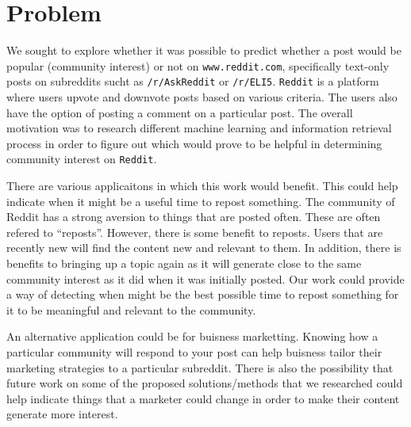 \documentclass{acm_proc_article-sp}
\begin{document}



\section{Problem}
We sought to explore whether it was possible to predict whether a post would be popular (community interest) or not on \texttt{www.reddit.com}, specifically text-only posts on subreddits sucht as \texttt{/r/AskReddit} or \texttt{/r/ELI5}. \texttt{Reddit} is a platform where users upvote and downvote posts based on various criteria. The users also have the option of posting a comment on a particular post. The overall motivation was to research different machine learning and information retrieval process in order to figure out which would prove to be helpful in determining community interest on \texttt{Reddit}.

There are various applicaitons in which this work would benefit. This could help indicate when it might be a useful time to repost something. The community of Reddit has a strong aversion to things that are posted often. These are often refered to ``reposts''. However, there is some benefit to reposts. Users that are recently new will find the content new and relevant to them. In addition, there is benefits to bringing up a topic again as it will generate close to the same community interest as it did when it was initially posted. Our work could provide a way of detecting when might be the best possible time to repost something for it to be meaningful and relevant to the community.

An alternative application could be for buisness marketting. Knowing how a particular community will respond to your post can help buisness tailor their marketing strategies to a particular subreddit. There is also the possibility that future work on some of the proposed solutions/methods that we researched could help indicate things that a marketer could change in order to make their content generate more interest.
\end{document}
